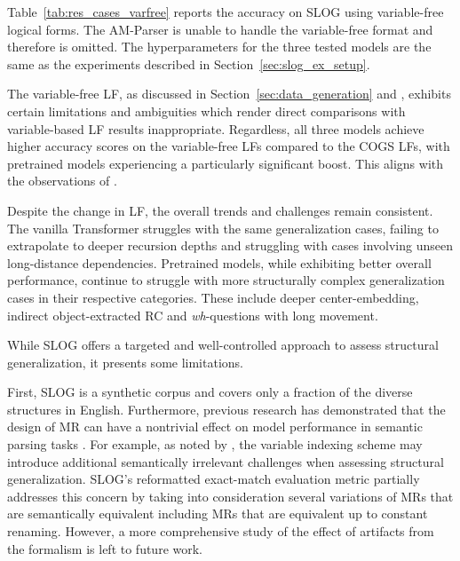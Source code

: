 Table~\ref{tab:res_cases_varfree} reports the accuracy on SLOG using variable-free logical forms. The AM-Parser is unable to handle the variable-free format and therefore is omitted. The hyperparameters for the three tested models are the same as the experiments described in Section~\ref{sec:slog_ex_setup}.

The variable-free LF, as discussed in Section~\ref{sec:data_generation} and \citet{wu2023recogs}, exhibits certain limitations and ambiguities which render direct comparisons with variable-based LF results inappropriate. Regardless, all three models achieve higher accuracy scores on the variable-free LFs compared to the COGS LFs, with pretrained models experiencing a particularly significant boost. This aligns with the observations of \citealt{qiu-etal-2022-evaluating}. 

Despite the change in LF, the overall trends and challenges remain consistent. The vanilla Transformer struggles with the same generalization cases, failing to extrapolate to deeper recursion depths and struggling with cases involving unseen long-distance dependencies. Pretrained models, while exhibiting better overall performance, continue to struggle with more structurally complex generalization cases in their respective categories. These include deeper center-embedding, indirect object-extracted RC and \emph{wh}-questions with long movement.




While SLOG offers a targeted and well-controlled approach to assess structural generalization, it presents some limitations.

First, SLOG is a synthetic corpus and covers only a fraction of the diverse structures in English. Furthermore, previous research has demonstrated that the design of \ac{MR} can have a nontrivial effect on model performance in semantic parsing tasks \citep{guo-etal-2019-towards,herzig2021unlocking,qiu-etal-2022-evaluating}. For example, as noted by \citet{wu2023recogs}, the variable indexing scheme may introduce additional semantically irrelevant challenges when assessing structural generalization. SLOG's reformatted exact-match evaluation metric partially addresses this concern by taking into consideration several variations of MRs that are semantically equivalent including MRs that are equivalent up to constant renaming. However, a more comprehensive study of the effect of artifacts from the formalism is left to future work. 

